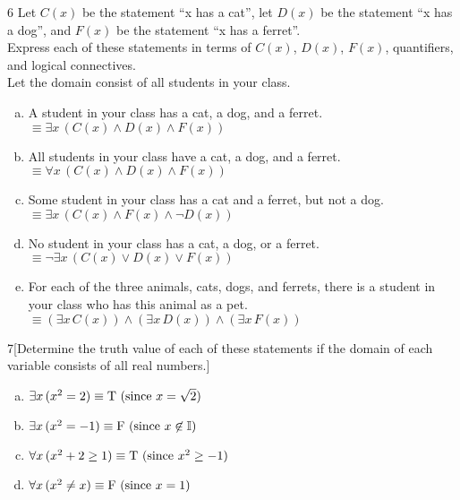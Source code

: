 \documentclass[11pt]{article}
\let\tt\text
\begin{document}
\vspace*{0pt}

\begin{problem}{6}
Let $C(x)$ be the statement ``x has a cat'', let $D(x)$ be the statement ``x has a dog'', and $F(x)$ be the statement ``x has a ferret''. \\
Express each of these statements in terms of $C(x)$, $D(x)$, $F(x)$, quantifiers, and logical connectives. \\
Let the domain consist of all students in your class.

\begin{enumerate}[(a)]
\item A student in your class has a cat, a dog, and a ferret. \\ 
  $\equiv \exists x \, (C(x) \land D(x) \land F(x))$ 

\item All students in your class have a cat, a dog, and a ferret. \\ 
  $\equiv \forall x \, (C(x) \land D(x) \land F(x))$ 

\item Some student in your class has a cat and a ferret, but not a dog. \\ 
  $\equiv \exists x \, (C(x) \land F(x) \land \neg D(x) )$ 
  
\item No student in your class has a cat, a dog, or a ferret. \\ 
  $\equiv \neg \exists x \, (C(x) \lor D(x) \lor F(x))$ 
  
\item For each of the three animals, cats, dogs, and ferrets, there is a student in your class who has this animal as a pet. \\ 
  $\equiv (\exists x \, C(x)) \land (\exists x \, D(x)) \land (\exists x \, F(x))$
  
\end{enumerate}
\end{problem}

\vspace*{0pt}

\begin{problem}{7}[Determine the truth value of each of these statements if the domain of each variable consists of all real numbers.]

\begin{enumerate}[(a)]
\item $\exists x \, (x^2 = 2) \\ \equiv \tt{T} \ (\textrm{since } x = \sqrt{2})$
\item $\exists x \, (x^2 = -1) \\ \equiv \tt{F} \ (\textrm{since } x \not\in \mathbb{I})$
\item $\forall x \, (x^2 + 2 \geq 1) \\ \equiv \tt{T} \ (\textrm{since } x^2 \geq -1)$
\item $\forall x \, (x^2 \neq x) \\ \equiv \tt{F} \ (\textrm{since } x = 1)$
\end{enumerate}
\end{problem}
\end{document}
